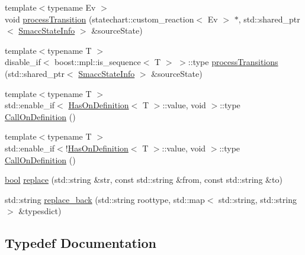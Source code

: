 \begin{DoxyCompactItemize}
\item 
{\footnotesize template$<$typename Ev $>$ }\\void \hyperlink{namespacesmacc_1_1introspection_a25f60bf498ae9f3d0324ed1b84ecbae4}{process\+Transition} (statechart\+::custom\+\_\+reaction$<$ Ev $>$ $\ast$, std\+::shared\+\_\+ptr$<$ \hyperlink{classsmacc_1_1introspection_1_1SmaccStateInfo}{Smacc\+State\+Info} $>$ \&source\+State)
\item 
{\footnotesize template$<$typename T $>$ }\\disable\+\_\+if$<$ boost\+::mpl\+::is\+\_\+sequence$<$ T $>$ $>$\+::type \hyperlink{namespacesmacc_1_1introspection_a24beffddf95fa3dce92051b336e65d8f}{process\+Transitions} (std\+::shared\+\_\+ptr$<$ \hyperlink{classsmacc_1_1introspection_1_1SmaccStateInfo}{Smacc\+State\+Info} $>$ \&source\+State)
\item 
{\footnotesize template$<$typename T $>$ }\\std\+::enable\+\_\+if$<$ \hyperlink{classsmacc_1_1introspection_1_1HasOnDefinition}{Has\+On\+Definition}$<$ T $>$\+::value, void $>$\+::type \hyperlink{namespacesmacc_1_1introspection_a14a28bfad794e98164dce1375d3b0796}{Call\+On\+Definition} ()
\item 
{\footnotesize template$<$typename T $>$ }\\std\+::enable\+\_\+if$<$!\hyperlink{classsmacc_1_1introspection_1_1HasOnDefinition}{Has\+On\+Definition}$<$ T $>$\+::value, void $>$\+::type \hyperlink{namespacesmacc_1_1introspection_a8cfcfc9c8896a6ff4bf22dbce6ecf838}{Call\+On\+Definition} ()
\item 
\hyperlink{classbool}{bool} \hyperlink{namespacesmacc_1_1introspection_a48571b9bf3b115d2a83cc0147c96d0bd}{replace} (std\+::string \&str, const std\+::string \&from, const std\+::string \&to)
\item 
std\+::string \hyperlink{namespacesmacc_1_1introspection_a19350163cda321a04645dcd6f6585f24}{replace\+\_\+back} (std\+::string roottype, std\+::map$<$ std\+::string, std\+::string $>$ \&typesdict)
\end{DoxyCompactItemize}


\subsection{Typedef Documentation}
\mbox{\label{namespacesmacc_1_1introspection_ac678f3918f2036c45d7d0da7f5afce83}} 
